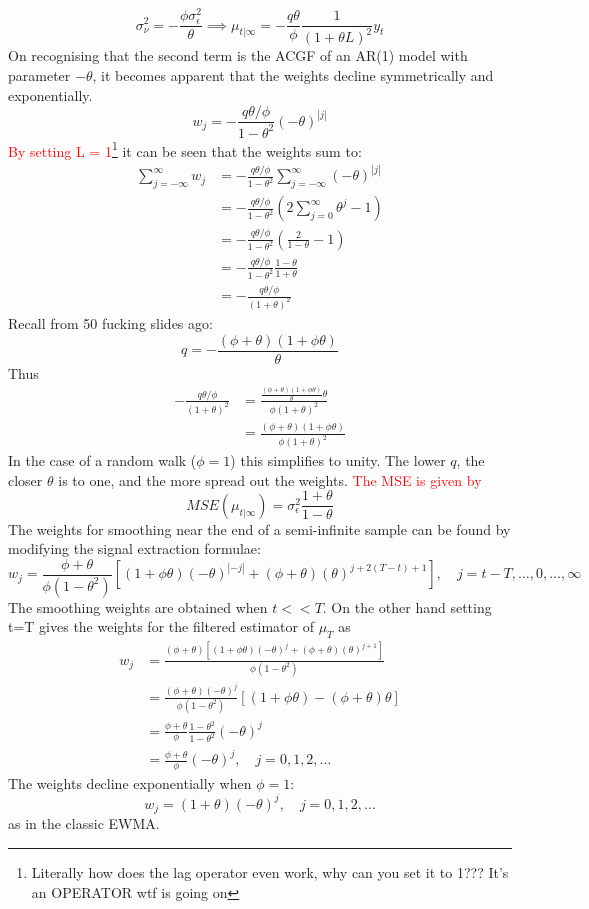 \documentclass[DIV=14,titlepage=false]{scrreprt}
\begin{document}
\[
\sigma^2_\nu = -\frac{\phi \sigma^2_\epsilon}{\theta} \implies \mu_{t|\infty} = -\frac{q \theta}{\phi} \frac{1}{(1+\theta L)^2} y_t
\]
On recognising that the second term is the ACGF of an AR(1) model with parameter $-\theta$, it becomes apparent that the weights decline symmetrically and exponentially. 
\[
    w_j = -\frac{q \theta / \phi}{1-\theta^2} (-\theta)^{|j|}
\]
\textcolor{red}{By setting L = 1}\footnote{Literally how does the lag operator even work, why can you set it to 1??? It's an OPERATOR wtf is going on} it can be seen that the weights sum to:
\begin{align*}
    \sum_{j=-\infty}^\infty w_j &= -\frac{q \theta / \phi}{1-\theta^2} \sum_{j=-\infty}^\infty (-\theta)^{|j|}\\
    &= -\frac{q \theta / \phi}{1-\theta^2} \left( 2 \sum_{j=0}^\infty \theta^j - 1 \right)\\
    &= -\frac{q \theta / \phi}{1-\theta^2} \left( \frac{2}{1-\theta} - 1 \right)\\
    &= -\frac{q \theta / \phi}{1-\theta^2} \frac{1-\theta}{1+\theta}\\
    &= -\frac{q \theta / \phi}{(1+\theta)^2}
\end{align*}
Recall from 50 fucking slides ago:
\[
    q = -\frac{(\phi + \theta)(1+\phi \theta)}{\theta}
\]
Thus
\begin{align*}
    -\frac{q \theta / \phi}{(1+\theta)^2} &= \frac{\frac{(\phi + \theta)(1+\phi \theta)}{\theta}\theta}{\phi(1+\theta)^2}\\
    &= \frac{(\phi+\theta)(1+\phi\theta)}{\phi(1+\theta)^2}
\end{align*}
In the case of a random walk ($\phi = 1$) this simplifies to unity. The lower $q$, the closer $\theta$ is to one, and the more spread out the weights. \textcolor{red}{The MSE is given by}
\[
    MSE(\mu_{t|\infty}) = \sigma^2_\epsilon \frac{1+\theta}{1-\theta}
\]
The weights for smoothing near the end of a semi-infinite sample can be found by modifying the signal extraction formulae:
\[
    w_j = \frac{\phi + \theta}{\phi(1-\theta^2)}[(1+\phi\theta)(-\theta)^{|-j|}+(\phi+\theta)(\theta)^{j+2(T-t)+1}], \quad j=t-T,\dots, 0, \dots, \infty
\]
The smoothing weights are obtained when $t<<T$. On the other hand setting t=T gives the weights for the filtered estimator of $\mu_T$ as
\begin{align*}
    w_j &= \frac{(\phi+\theta)[(1+\phi\theta)(-\theta)^j + (\phi+\theta)(\theta)^{j+1}]}{\phi(1-\theta^2)}\\
    &= \frac{(\phi+\theta)(-\theta)^j}{\phi(1-\theta^2)}[(1+\phi\theta) - (\phi+\theta)\theta]\\
    &= \frac{\phi+\theta}{\phi}\frac{1-\theta^2}{1-\theta^2}(-\theta)^j\\
    &= \frac{\phi+\theta}{\phi}(-\theta)^j, \quad j=0,1,2,\dots
\end{align*}
The weights decline exponentially when $\phi =1$:
\[
    w_j = (1+\theta)(-\theta)^j, \quad j=0,1,2,\dots
\]
as in the classic EWMA.
\end{document}
